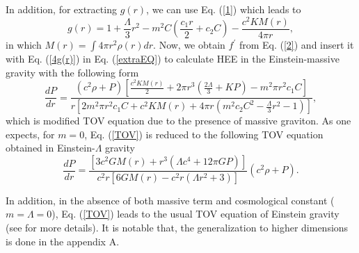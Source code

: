 \documentclass[aps]{revtex4}
\begin{document}
In addition, for extracting $g(r)$, we can use Eq. (\ref{1}) which leads to
\begin{equation}
g(r)=1+\frac{\Lambda }{3}r^{2}-m^{2}C\left( \frac{c_{1}r}{2}+c_{2}C\right) -%
\frac{c^{2}KM(r)}{4\pi r},  \label{4g(r)}
\end{equation}%
in which $M(r)=\int 4\pi r^{2}\rho (r)dr$. Now, we obtain
$f^{\prime }$ from Eq. (\ref{2}) and insert it with Eq.
(\ref{4g(r)}) in Eq. (\ref{extraEQ}) to calculate HEE in the
Einstein-massive gravity with the following form
\begin{equation}
\frac{dP}{dr}=\frac{\left( c^{2}\rho +P\right) \left[ \frac{c^{2}KM(r)}{2}%
+2\pi r^{3}\left( \frac{2\Lambda }{3}+KP\right) -m^{2}\pi r^{2}c_{1}C\right]
}{r\left[ 2m^{2}\pi r^{2}c_{1}C+c^{2}KM(r)+4\pi r\left( m^{2}c_{2}C^{2}-%
\frac{\Lambda }{3}r^{2}-1\right) \right] },  \label{TOV}
\end{equation}%
which is modified TOV equation due to the presence of massive graviton. As
one expects, for $m=0$, Eq. (\ref{TOV}) is reduced to the following TOV
equation obtained in Einstein-$\Lambda $ gravity \cite{TOVLambda,TOV-Lambda}
\begin{equation}
\frac{dP}{dr}=\frac{\left[ 3c^{2}G M(r)+r^{3}\left( \Lambda
c^{4}+12\pi
GP\right) \right] }{c^{2}r\left[ 6 G M(r)-c^{2}r\left( \Lambda r^{2}+3\right) %
\right] }\left( c^{2}\rho +P\right) .  \label{4TOV}
\end{equation}

In addition, in the absence of both massive term and cosmological constant ($%
m=\Lambda =0$), Eq. (\ref{TOV}) leads to the usual TOV equation of
Einstein gravity (see \cite{Tolman,Tolman1939,Oppenheimer} for
more details). It is notable that, the generalization to higher
dimensions is done in the appendix A.
\end{document}
